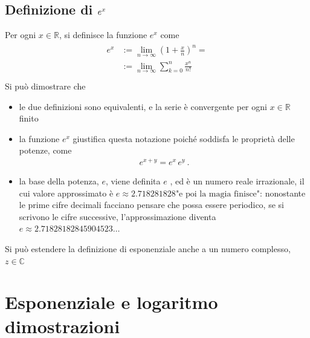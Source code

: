 \documentclass[letterpaper,10pt,english]{jupyterBook}
\begin{document}
\subsection{Definizione di \protect\(e^x\protect\)}
\label{\detokenize{ch/exponential_logarithm:definizione-di-e-x}}
\sphinxAtStartPar
{} Per ogni \(x \in \mathbb{R}\), si definisce la funzione \(e^x\) come
\begin{equation*}
\begin{split}\begin{aligned}
e^x & := \lim_{n \rightarrow \infty} \left( 1 + \frac{x}{n}\right)^n  = \\
    & := \lim_{n \rightarrow \infty} \sum_{k=0}^{n} \frac{x^n}{n!} \\
\end{aligned}\end{split}
\end{equation*}
\sphinxAtStartPar
Si può dimostrare che
\begin{itemize}
\item {} 
\sphinxAtStartPar
le due definizioni sono equivalenti, e la serie è convergente per ogni \(x \in \mathbb{R}\) finito

\item {} 
\sphinxAtStartPar
la funzione \(e^x\) giustifica questa notazione poiché soddisfa le proprietà delle potenze, come
\begin{equation*}
\begin{split}e^{x+y} = e^x \, e^y \ .\end{split}
\end{equation*}
\item {} 
\sphinxAtStartPar
la base della potenza, \(e\), viene definita \(e\) , ed è un numero reale irrazionale, il cui valore approssimato è \(e \approx 2.718281828\text{"e poi la magia finisce"}\): nonostante le prime cifre decimali facciano pensare che possa essere periodico, se si scrivono le cifre successive, l’approssimazione diventa \(e \approx 2.71828182845904523\dots\)

\end{itemize}

\sphinxAtStartPar
{} Si può estendere la definizione di esponenziale anche a un numero complesso, \(z \in \mathbb{C}\)

\sphinxstepscope


\section{Esponenziale e logaritmo \sphinxhyphen{} dimostrazioni}
\label{\detokenize{ch/exponential_logarithm-proof:esponenziale-e-logaritmo-dimostrazioni}}\label{\detokenize{ch/exponential_logarithm-proof:math-hs-exp-log-proof}}\label{\detokenize{ch/exponential_logarithm-proof::doc}}
\end{document}
